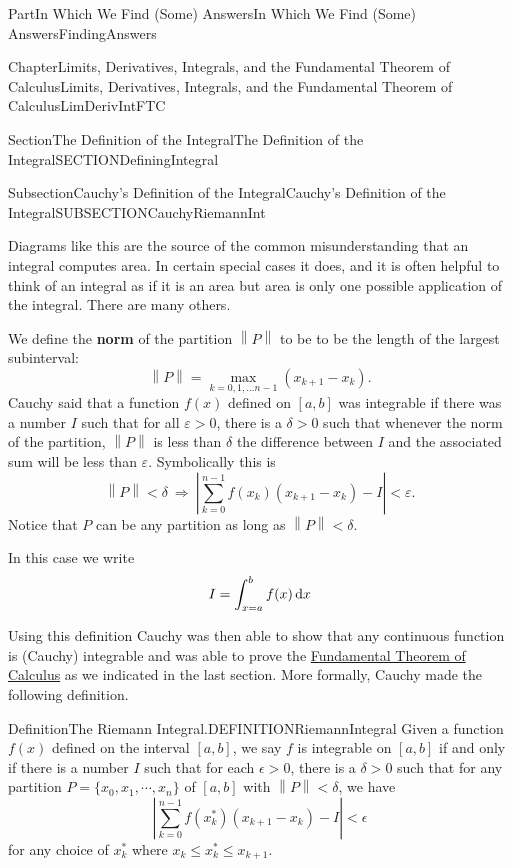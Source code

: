 \documentclass[oneside,10pt,]{book}
\newcommand{\terminology}[1]{\textbf{#1}}
\numberwithin{equation}{part}
\newcommand{\norm}[1]{\left\|#1\right\|}
\newcommand{\imp}{\ \Rightarrow\ }
\newcommand{\dx}[1]{\,{\rm d}#1}
\newcommand{\abs}[1]{\left|#1\right|}
\newcommand{\eps}{\varepsilon}
\newcommand{\lt}{<}
\begin{document}
\begin{partptx}{Part}{In Which We Find (Some) Answers}{}{In Which We Find (Some) Answers}{}{}{FindingAnswers}
\begin{chapterptx}{Chapter}{Limits, Derivatives, Integrals, and the Fundamental Theorem of Calculus}{}{Limits, Derivatives, Integrals, and the Fundamental Theorem of Calculus}{}{}{LimDerivIntFTC}
\begin{sectionptx}{Section}{The Definition of the Integral}{}{The Definition of the Integral}{}{}{SECTIONDefiningIntegral}
\begin{subsectionptx}{Subsection}{Cauchy's Definition of the Integral}{}{Cauchy's Definition of the Integral}{}{}{SUBSECTIONCauchyRiemannInt}
\par
Diagrams like this are the source of the common misunderstanding that an integral computes area. In certain special cases it does, and it is often helpful to think of an integral as if it is an area but area is only one possible application of the integral. There are many others.%
\par
We define the \terminology{norm} of the partition \(\norm{P}\) to be to be the length of the largest subinterval:%
\begin{equation*}
\norm{P}=\max_{k=0, 1, \dots    n-1}(x_{k+1}-x_k) \text{.}
\end{equation*}
Cauchy said that a function \(f(x)\) defined on \([a,b]\) was integrable if there was a number \(I\) such that for all \(\eps >0\), there is a \(\delta >0\) such that whenever the norm of the partition, \(\norm{P}\) is less than \(\delta{}\) the difference between \(I\) and the  associated sum will be less than \(\eps{}\). Symbolically this is%
\begin{equation*}
\norm{P}\lt \delta \imp \abs{\sum^{n-1}_{k=0}{f\left(x_k\right)\left(x_{k+1}-x_k\right)}-I}\lt
\eps \text{.}
\end{equation*}
Notice that \(P\) can be any partition as long as \(\norm{P}\lt\delta \).%
\par
In this case we write%
\begin{equation*}
I=\int^b_{x=a}{f(x)\dx{x}}
\end{equation*}
%
\par
Using this definition Cauchy was then able to show that any continuous function is (Cauchy) integrable and was able to prove the \hyperref[THEOREMFTCCauchy]{Fundamental Theorem of Calculus} as we indicated in the last section. More formally, Cauchy made the following definition.%
\begin{definition}{Definition}{The Riemann Integral.}{DEFINITIONRiemannIntegral}%
%
%
Given a function \(f(x)\) defined on the interval \([a,b]\), we say \(f\) is integrable on \([a,b]\) if and only if there is a number \(I\) such that for each \(\epsilon >0\), there is a \(\delta >0\) such that for any partition \(P=\{x_0, x_1, \cdots, x_n\}\) of \([a,b]\) with \(\norm{P}\lt\delta \), we have%
\begin{equation*}
\left|\sum^{n-1}_{k=0}{f\left(x^*_k\right)\left(x_{k+1}-x_k\right)}-I\right|\lt\epsilon 
\end{equation*}
for any choice of \(x^*_k\) where \(x_k\le x^*_k\le x_{k+1}\).%

\end{definition}
\end{subsectionptx}
\end{sectionptx}
\end{chapterptx}
\end{partptx}
\end{document}
